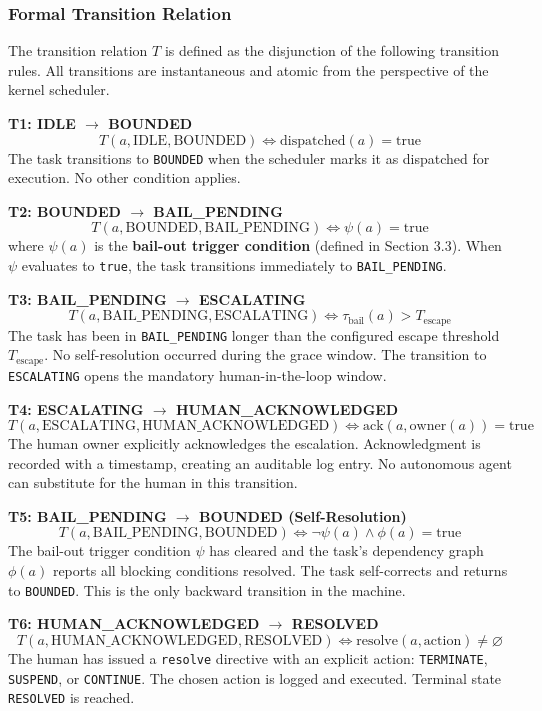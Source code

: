 \subsubsection{Formal Transition Relation}
The transition relation $T$ is defined as the disjunction of the following transition rules. All transitions are instantaneous and atomic from the perspective of the kernel scheduler.

\medskip\noindent\textbf{T1: IDLE $\rightarrow$ BOUNDED}
\[
T(a, \text{IDLE}, \text{BOUNDED}) \iff \text{dispatched}(a) = \text{true}
\]
The task transitions to \texttt{BOUNDED} when the scheduler marks it as dispatched for execution. No other condition applies.

\medskip\noindent\textbf{T2: BOUNDED $\rightarrow$ BAIL\_PENDING}
\[
T(a, \text{BOUNDED}, \text{BAIL\_PENDING}) \iff \psi(a) = \text{true}
\]
where $\psi(a)$ is the \textbf{bail-out trigger condition} (defined in Section 3.3). When $\psi$ evaluates to \texttt{true}, the task transitions immediately to \texttt{BAIL\_PENDING}.

\medskip\noindent\textbf{T3: BAIL\_PENDING $\rightarrow$ ESCALATING}
\[
T(a, \text{BAIL\_PENDING}, \text{ESCALATING}) \iff \tau_\text{bail}(a) > T_\text{escape}
\]
The task has been in \texttt{BAIL\_PENDING} longer than the configured escape threshold $T_\text{escape}$. No self-resolution occurred during the grace window. The transition to \texttt{ESCALATING} opens the mandatory human-in-the-loop window.

\medskip\noindent\textbf{T4: ESCALATING $\rightarrow$ HUMAN\_ACKNOWLEDGED}
\[
T(a, \text{ESCALATING}, \text{HUMAN\_ACKNOWLEDGED}) \iff \text{ack}(a, \text{owner}(a)) = \text{true}
\]
The human owner explicitly acknowledges the escalation. Acknowledgment is recorded with a timestamp, creating an auditable log entry. No autonomous agent can substitute for the human in this transition.

\medskip\noindent\textbf{T5: BAIL\_PENDING $\rightarrow$ BOUNDED (Self-Resolution)}
\[
T(a, \text{BAIL\_PENDING}, \text{BOUNDED}) \iff \neg\psi(a) \land \phi(a) = \text{true}
\]
The bail-out trigger condition $\psi$ has cleared and the task's dependency graph $\phi(a)$ reports all blocking conditions resolved. The task self-corrects and returns to \texttt{BOUNDED}. This is the only backward transition in the machine.

\medskip\noindent\textbf{T6: HUMAN\_ACKNOWLEDGED $\rightarrow$ RESOLVED}
\[
T(a, \text{HUMAN\_ACKNOWLEDGED}, \text{RESOLVED}) \iff \text{resolve}(a, \text{action}) \neq \varnothing
\]
The human has issued a \texttt{resolve} directive with an explicit action: \texttt{TERMINATE}, \texttt{SUSPEND}, or \texttt{CONTINUE}. The chosen action is logged and executed. Terminal state \texttt{RESOLVED} is reached.

